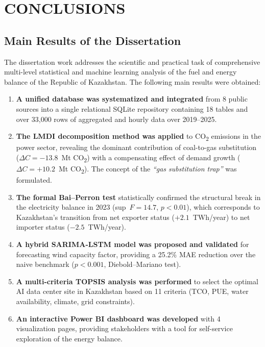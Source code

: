 
\chapter{CONCLUSIONS}
\label{ch:conclusions}

\section{Main Results of the Dissertation}
\label{sec:concl_main}

The dissertation work addresses the scientific and practical task of comprehensive multi-level statistical and machine learning analysis of the fuel and energy balance of the Republic of Kazakhstan. The following main results were obtained:

\begin{enumerate}
    \item \textbf{A unified database was systematized and integrated} from 8 public sources into a single relational SQLite repository containing 18 tables and over 33{,}000 rows of aggregated and hourly data over 2019--2025.

    \item \textbf{The LMDI decomposition method was applied} to CO\textsubscript{2} emissions in the power sector, revealing the dominant contribution of coal-to-gas substitution ($\Delta C = -13.8$~Mt CO\textsubscript{2}) with a compensating effect of demand growth ($\Delta C = +10.2$~Mt CO\textsubscript{2}). The concept of the \emph{``gas substitution trap''} was formulated.

    \item \textbf{The formal Bai--Perron test} statistically confirmed the structural break in the electricity balance in 2023 (sup~$F = 14.7$, $p < 0.01$), which corresponds to Kazakhstan's transition from net exporter status ($+2.1$~TWh/year) to net importer status ($-2.5$~TWh/year).

    \item \textbf{A hybrid SARIMA-LSTM model was proposed and validated} for forecasting wind capacity factor, providing a 25.2\% MAE reduction over the naive benchmark ($p < 0.001$, Diebold--Mariano test).

    \item \textbf{A multi-criteria TOPSIS analysis was performed} to select the optimal AI data center site in Kazakhstan based on 11 criteria (TCO, PUE, water availability, climate, grid constraints).

    \item \textbf{An interactive Power BI dashboard was developed} with 4 visualization pages, providing stakeholders with a tool for self-service exploration of the energy balance.
\end{enumerate}

